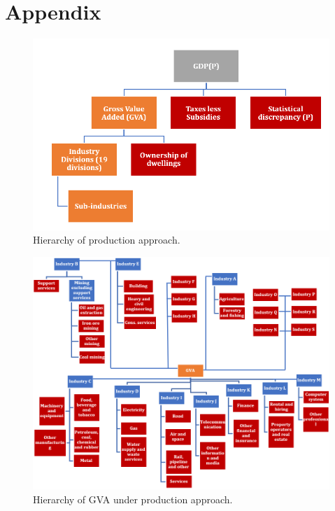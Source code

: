 \documentclass[graybox]{svmult}
\begin{document}
\pagebreak



\section*{Appendix}

\begin{figure}[H]
	\centering
	\small
	\includegraphics[scale=0.65]{Figs/GDP_P_fig1.PNG}
	\caption{Hierarchy of production approach.}\label{GDP_P_fig1}
\end{figure}

\begin{figure}[H]
	\centering
	\small
	\includegraphics[scale=1]{Figs/GDP_P_fig2.PNG}
	\caption{Hierarchy of GVA under production approach.}\label{GDP_P_fig2}
\end{figure}
\end{document}
